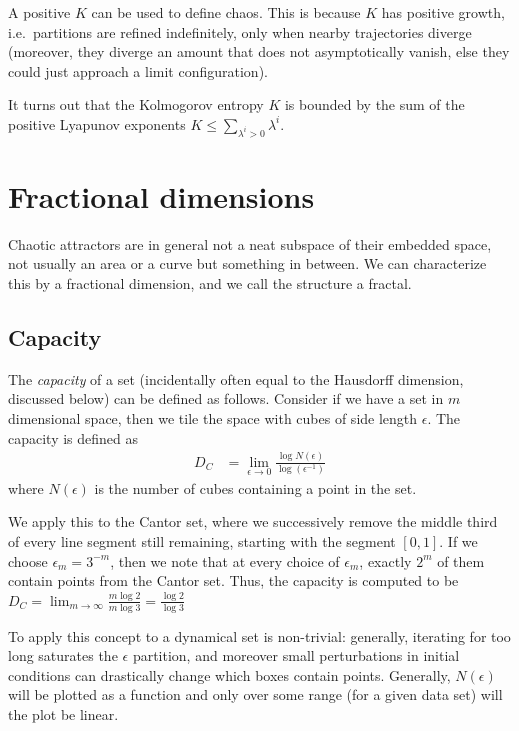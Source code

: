 \documentclass[12pt]{article}
\begin{document}
A positive $K$ can be used to define chaos. This is because $K$ has positive
growth, i.e.\ partitions are refined indefinitely, only when nearby trajectories
diverge (moreover, they diverge an amount that does not asymptotically vanish,
else they could just approach a limit configuration).

It turns out that the Kolmogorov entropy $K$ is bounded by the sum of the
positive Lyapunov exponents $K \leq \sum\limits_{\lambda^i > 0}^{}\lambda^i$.

\clearpage

\section{Fractional dimensions}

Chaotic attractors are in general not a neat subspace of their embedded space,
not usually an area or a curve but something in between. We can characterize
this by a fractional dimension, and we call the structure a fractal.

\subsection{Capacity}

The \emph{capacity} of a set (incidentally often equal to the Hausdorff
dimension, discussed below) can be defined as follows. Consider if we have a set
in $m$ dimensional space, then we tile the space with cubes of side length
$\epsilon$. The capacity is defined as
\begin{align}
    D_C &= \lim_{\epsilon \to 0}\frac{\log N(\epsilon)}{\log(\epsilon^{-1})}
\end{align}
where $N(\epsilon)$ is the number of cubes containing a point in the set.

We apply this to the Cantor set, where we successively remove the middle third
of every line segment still remaining, starting with the segment $[0,1]$. If we
choose $\epsilon_m = 3^{-m}$, then we note that at every choice of $\epsilon_m$,
exactly $2^m$ of them contain points from the Cantor set. Thus, the capacity is
computed to be
$D_C = \lim_{m \to \infty}\frac{m\log 2}{m \log 3} = \frac{\log 2}{\log 3}$

To apply this concept to a dynamical set is non-trivial: generally, iterating
for too long saturates the $\epsilon$ partition, and moreover small
perturbations in initial conditions can drastically change which boxes contain
points. Generally, $N(\epsilon)$ will be plotted as a function and only over
some range (for a given data set) will the plot be linear.
\end{document}
